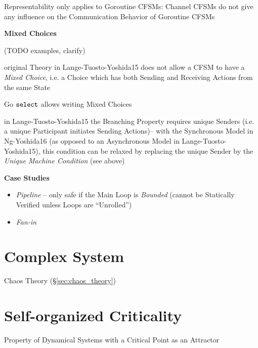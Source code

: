 Representability only applies to Goroutine CFSMs: Channel CFSMs do not
give any influence on the Communication Behavior of Goroutine CFSMs


\textbf{Mixed Choices}

(TODO examples, clarify)

original Theory in Lange-Tuosto-Yoshida15 does not allow a CFSM to
have a \emph{Mixed Choice}, i.e. a Choice which has both Sending and
Receiving Actions from the same State

Go $\mathtt{select}$ allows writing Mixed Choices

in Lange-Tuosto-Yoshida15 the Branching Property requires unique
Senders (i.e. a unique Participant initiates Sending Actions)-- with
the Synchronous Model in Ng-Yoshida16 (as opposed to an Asynchronous
Model in Lange-Tuosto-Yoshida15), this condition can be relaxed by
replacing the unique Sender by the \emph{Unique Machine Condition}
(see above)


\textbf{Case Studies}

\begin{itemize}
  \item \emph{Pipeline} -- only safe if the Main Loop is
    \emph{Bounded} (cannot be Statically Verified unless Loops are
    ``Unrolled'')
  \item \emph{Fan-in}
\end{itemize}



\section{Complex System}\label{sec:complex_system}

Chaos Theory (\S\ref{sec:chaos_theory})



\section{Self-organized Criticality}\label{sec:self_organized_criticality}

Property of Dynamical Systems with a Critical Point as an Attractor




